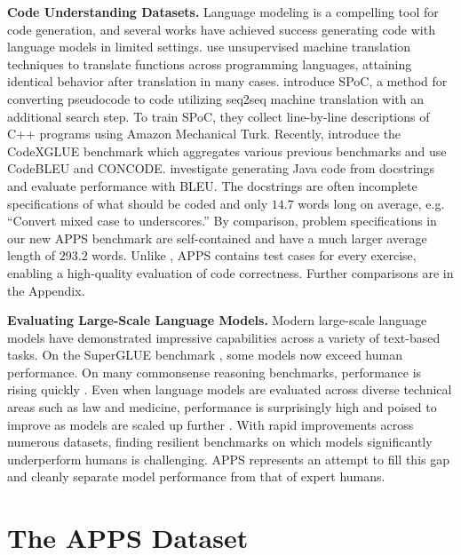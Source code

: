 \documentclass{article}
\begin{document}
\textbf{Code Understanding Datasets.}\quad
Language modeling is a compelling tool for code generation, and several works have achieved success generating code with language models in limited settings. \citet{lachaux2020unsupervised} use unsupervised machine translation techniques to translate functions across programming languages, attaining identical behavior after translation in many cases. \citet{NEURIPS2019_7298332f} introduce SPoC, a method for converting pseudocode to code utilizing seq2seq machine translation with an additional search step. To train SPoC, they collect line-by-line descriptions of C++ programs using Amazon Mechanical Turk. Recently, \citet{Lu2021CodeXGLUEAM} introduce the CodeXGLUE benchmark which aggregates various previous benchmarks and use CodeBLEU \citep{Ren2020CodeBLEUAM} and CONCODE. \citet{iyer-etal-2018-mapping} investigate generating Java code from docstrings and evaluate performance with BLEU. The docstrings are often incomplete specifications of what should be coded and only $14.7$ words long on average, e.g. ``Convert mixed case to underscores.'' By comparison, problem specifications in our new APPS benchmark are self-contained and have a much larger average length of $293.2$ words. Unlike \citet{iyer-etal-2018-mapping}, APPS contains test cases for every exercise, enabling a high-quality evaluation of code correctness. Further comparisons are in the Appendix.

\textbf{Evaluating Large-Scale Language Models.}\quad
Modern large-scale language models have demonstrated impressive capabilities across a variety of text-based tasks. On the SuperGLUE benchmark \citep{Wang2019SuperGLUEAS}, some models now exceed human performance. On many commonsense reasoning benchmarks, performance is rising quickly \citep{zellers2019hellaswag,huang2019cosmosqa,bisk2019physicaliqa}. Even when language models are evaluated across diverse technical areas such as law and medicine, performance is surprisingly high and poised to improve as models are scaled up further \citep{hendryckstest2021}. With rapid improvements across numerous datasets, finding resilient benchmarks on which models significantly underperform humans is challenging. APPS represents an attempt to fill this gap and cleanly separate model performance from that of expert humans.











 \section{The APPS Dataset}\label{sec:dataset}
\end{document}
